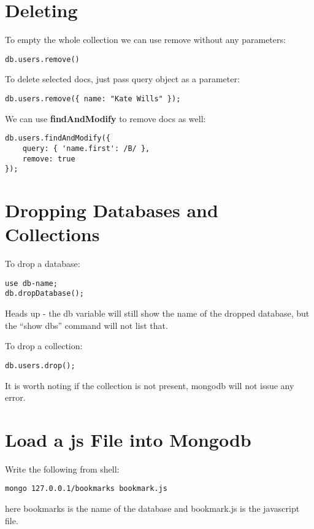 \documentclass[a4paper, 12pt]{article}
\begin{document}
\section{Deleting}
To empty the whole collection we can use remove without any parameters:
\begin{verbatim}
db.users.remove()
\end{verbatim}
To delete selected docs, just pass query object as a parameter:
\begin{verbatim}
db.users.remove({ name: "Kate Wills" });
\end{verbatim}
We can use \textbf{findAndModify} to remove docs as well:
\begin{verbatim}
db.users.findAndModify({
    query: { 'name.first': /B/ },
    remove: true
});
\end{verbatim}

\section{Dropping Databases and Collections}
To drop a database:
\begin{verbatim}
use db-name;
db.dropDatabase();
\end{verbatim}
Heads up - the db variable will still show the name of the dropped database, but the ``show dbs'' command will not list that.

To drop a collection:
\begin{verbatim}
db.users.drop();
\end{verbatim}
It is worth noting if the collection is not present, mongodb will not issue any error.

\section{Load a js File into Mongodb}
Write the following from shell:
\begin{verbatim}
mongo 127.0.0.1/bookmarks bookmark.js
\end{verbatim}
here bookmarks is the name of the database and bookmark.js is the javascript file.
\end{document}

